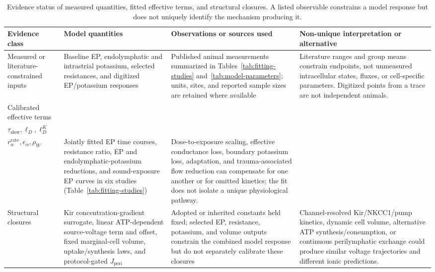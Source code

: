 \documentclass[final,5p,times]{elsarticle}
\begin{document}
\begin{table}[!t]
\caption{Evidence status of measured quantities, fitted effective terms, and structural closures. A listed observable constrains a model response but does not uniquely identify the mechanism producing it.}\label{tab:evidence-status}
\centering\footnotesize
\begingroup
\setlength{\tabcolsep}{3pt}\renewcommand{\arraystretch}{1.12}
\begin{tabular}{@{}>{\raggedright\arraybackslash}p{2.4cm}>{\raggedright\arraybackslash}p{3.8cm}>{\raggedright\arraybackslash}p{4.4cm}>{\raggedright\arraybackslash}p{4.8cm}@{}}
\toprule
\textbf{Evidence class} & \textbf{Model quantities} & \textbf{Observations or sources used} & \textbf{Non-unique interpretation or alternative} \\
\midrule
Measured or literature-constrained inputs & Baseline EP, endolymphatic and intrastrial potassium, selected resistances, and digitized EP/potassium responses & Published animal measurements summarized in Tables~\ref{tab:fitting-studies} and~\ref{tab:model-parameters}; units, sites, and reported sample sizes are retained where available & Literature ranges and group means constrain endpoints, not unmeasured intracellular states, fluxes, or cell-specific parameters. Digitized points from a trace are not independent animals. \\
Calibrated effective terms & \shortstack[l]{\(d_{\mathrm{GP}},s_{\mathrm{Ch}},f_{\mathrm{slow}}\)\\\(\tau_{\mathrm{slow}},\ell_D,\ell_D^K\)\\\(r_\alpha^{\mathrm{rate}},e_\alpha,\rho_W\)} & Jointly fitted EP time courses, resistance ratio, EP and endolymphatic-potassium reductions, and sound-exposure EP curves in six studies (Table~\ref{tab:fitting-studies}) & Dose-to-exposure scaling, effective conductance loss, boundary potassium loss, adaptation, and trauma-associated flow reduction can compensate for one another or for omitted kinetics; the fit does not isolate a unique physiological pathway. \\
Structural closures & Kir concentration-gradient surrogate, linear ATP-dependent source-voltage term and offset, fixed marginal-cell volume, uptake/synthesis laws, and protocol-gated \(J_{\mathrm{peri}}\) & Adopted or inherited constants held fixed; selected EP, resistance, potassium, and volume outputs constrain the combined model response but do not separately calibrate these closures & Channel-resolved Kir/NKCC1/pump kinetics, dynamic cell volume, alternative ATP synthesis/consumption, or continuous perilymphatic exchange could produce similar voltage trajectories and different ionic predictions. \\
\bottomrule
\end{tabular}
\endgroup
\end{table}
\end{document}
